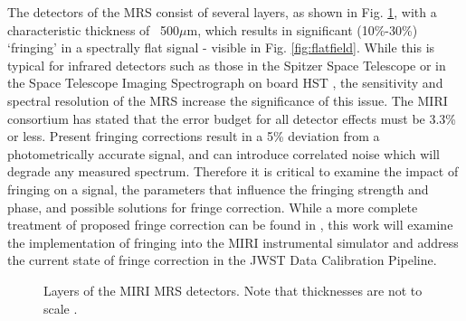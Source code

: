 The detectors of the MRS consist of several layers, as shown in Fig. \ref{fig:layers}, with a characteristic thickness of ~500$\mu$m, which results in significant (10\%-30\%) `fringing' in a spectrally flat signal - visible in Fig. \ref{fig:flatfield}.
While this is typical for infrared detectors such as those in the Spitzer Space Telescope \parencite{Lahuis2003} or in the Space Telescope Imaging Spectrograph on board HST \parencite{Malumuth2003}, the sensitivity and spectral resolution of the MRS increase the significance of this issue.
The MIRI consortium has stated that the error budget for all detector effects must be 3.3\% or less. 
Present fringing corrections result in a 5\% deviation from a photometrically accurate signal, and can introduce correlated noise which will degrade any measured spectrum.
Therefore it is critical to examine the impact of fringing on a signal, the parameters that influence the fringing strength and phase, and possible solutions for fringe correction. 
While a more complete treatment of proposed fringe correction can be found in \parencite{Argryiou2020}, this work will examine the implementation of fringing into the MIRI instrumental simulator and address the current state of fringe correction in the JWST Data Calibration Pipeline.

\begin{figure}
	\centering
	\begin{scriptsize}
	\end{scriptsize}
	\caption{Layers of the MIRI MRS detectors. Note that thicknesses are not to scale \parencite{MIRI7}.}
	\label{fig:layers}
\end{figure}

